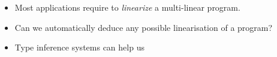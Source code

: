 \documentclass[10pt]{beamer}
\begin{document}
\begin{frame}
\begin{center}
  \end{center}

  \begin{itemize}
  \item Most applications require to \emph{linearize} a multi-linear
    program.
  \item Can we automatically deduce any possible linearisation of a
    program?
  \item \alert{Type inference systems can help us}
  \end{itemize}
\end{frame}

\end{document}
